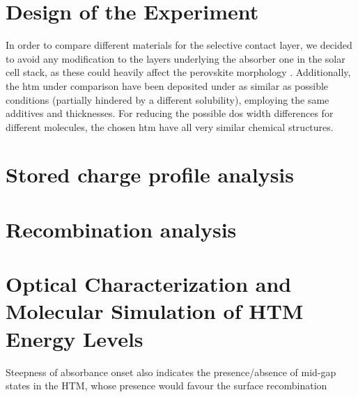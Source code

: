 \section{Design of the Experiment}
In order to compare different materials for the selective contact layer, we decided to avoid any modification to the layers underlying the absorber one in the solar cell stack, as these could heavily affect the perovskite morphology \cite{Tao2017}.
Additionally, the \gls{htm} under comparison have been deposited under as similar as possible conditions (partially hindered by a different solubility), employing the same additives and thicknesses.
For reducing the possible \gls{dos} width differences for different molecules, the chosen \gls{htm} have all very similar chemical structures.

%
%
%
%
%

\section{Stored charge profile analysis}

\section{Recombination analysis}

\section{Optical Characterization and Molecular Simulation of HTM Energy Levels}

Steepness of absorbance onset also indicates the presence/absence of mid-gap states in the HTM, whose presence would favour the surface recombination \cite{Tvingstedt2017}



